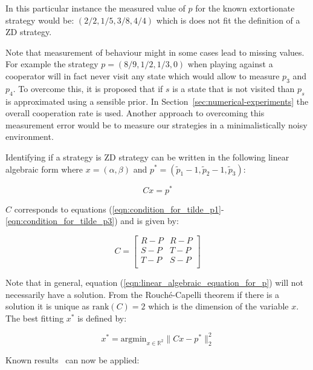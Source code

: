 \documentclass[a4paper]{article}
\begin{document}
In this particular instance the measured value of \(p\) for the known
extortionate strategy would be: \((2/2, 1/5, 3/8, 4/4)\) which is does not fit
the definition of a ZD strategy.

Note that measurement of behaviour might in some cases lead to missing values.
For example the strategy \(p=(8 / 9, 1 / 2, 1 / 3, 0)\) when playing against a
cooperator will in fact never visit any state which would allow to measure
\(p_3\) and \(p_4\). To overcome this, it is proposed that if \(s\) is a state
that is not visited than \(p_s\) is approximated using a sensible prior. In
Section~\ref{sec:numerical-experiments} the overall cooperation rate is used.
Another approach to overcoming this measurement error would be to measure our
strategies in a minimalistically noisy environment.

Identifying if a strategy is ZD strategy can be written in the following linear
algebraic form where \(x=(\alpha, \beta)\) and \(p^*=(\tilde p_1 - 1, \tilde p_2
- 1, \tilde p_3)\):

\begin{equation}\label{eqn:linear_algebraic_equation_for_p}
    Cx= p^*
\end{equation}

\(C\) corresponds to equations
(\ref{eqn:condition_for_tilde_p1}-\ref{eqn:condition_for_tilde_p3}) and is
given by:

\begin{equation}\label{eqn:definition_of_C}
    C =
    \begin{bmatrix}
        R - P & R- P \\
        S - P & T- P \\
        T - P & S- P \\
    \end{bmatrix}
\end{equation}

Note that in general, equation (\ref{eqn:linear_algebraic_equation_for_p}) will
not necessarily have a solution. From the Rouch\'{e}-Capelli theorem if there is
a solution it is unique as \(\text{rank}(C)=2\) which is the dimension of the
variable \(x\). The best fitting \(x^*\) is defined by:

\begin{equation}\label{eqn:x_star}
    x^* = \text{argmin}_{x\in\mathbb{R}^2}\|C x- p^*\|_2^2
\end{equation}

Known results~\cite{kutner2004applied, rao1973linear, wakefield2013bayesian} can
now be applied:
\end{document}
